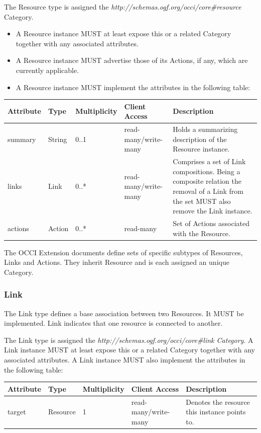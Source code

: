 \documentclass[10pt,a4paper]{article}
\begin{document}
The Resource type is assigned the \textit{http://schemas.ogf.org/occi/core\#resource} Category.

\begin{itemize}
  \item A Resource instance MUST at least expose this or a related Category together with any associated attributes.
  \item A Resource instance MUST advertise those of its Actions, if any, which are currently applicable.
  \item A Resource instance MUST implement the attributes in the following table:
\end{itemize}

\begin{tabular}{l|l|l|l|p{2.7in}}
Attribute & Type & Multiplicity & Client Access & Description \\
\hline
summary & String & 0..1 & read-many/write-many & Holds a summarizing description of the Resource instance.\\
links & Link & 0..* & read-many/write-many & Comprises a set of Link compositions. Being a composite relation the removal of a Link from the set MUST also remove the Link instance.\\
actions & Action & 0..* & read-many & Set of Actions associated with the Resource.\\
\end{tabular}

The OCCI Extension documents define sets of specific subtypes of Resources,
Links and Actions. They inherit Resource and is each assigned an unique
Category.

\subsubsection{Link}
The Link type defines a base association between two Resources. It MUST be
implemented. Link indicates that one resource is connected to another.

The Link type is assigned the \textit{http://schemas.ogf.org/occi/core\#link
Category}. A Link instance MUST at least expose this or a related Category
together with any associated attributes. A Link instance MUST also implement
the attributes in the following table:

\begin{tabular}{l|l|l|l|p{2.7in}}
Attribute & Type & Multiplicity & Client Access & Description \\
\hline
target & Resource & 1 & read-many/write-many & Denotes the resource this instance points to.\\
\end{tabular}
\end{document}
